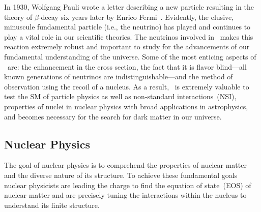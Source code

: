 In 1930, Wolfgang Pauli wrote a letter describing a new particle resulting in the theory of $\beta$-decay six years later by Enrico Fermi~\cite{bilenky:2013:neutrino}. Evidently, the elusive, minuscule fundamental particle (i.e., the neutrino) has played and continues to play a vital role in our scientific theories. The neutrinos involved in \cevns\ makes this reaction extremely robust and important to study for the advancements of our fundamental understanding of the universe. Some of the most enticing aspects of \cevns\ are: the enhancement in the cross section, the fact that it is flavor blind---all known generations of neutrinos are indistinguishable---and the method of observation using the recoil of a nucleus. As a result, \cevns\ is extremely valuable to test the SM of particle physics as well as non-standard interactions~(NSI), properties of nuclei in nuclear physics with broad applications in astrophysics, and becomes necessary for the search for dark matter in our universe.

\subsection{Nuclear Physics}
\label{sec:nuclearmot}

The goal of nuclear physics is to comprehend the properties of nuclear matter and the diverse nature of its structure. To achieve these fundamental goals nuclear physicists are leading the charge to find the equation of state~(EOS) of nuclear matter and are precisely tuning the  interactions within the nucleus to understand its finite structure. 

